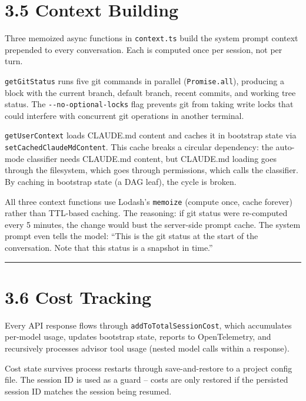 \documentclass[
  english,
  11pt,
  letterpaper,
]{book}
\begin{document}
\section{3.5 Context Building}\label{context-building}

Three memoized async functions in \texttt{context.ts} build the system
prompt context prepended to every conversation. Each is computed once
per session, not per turn.

\texttt{getGitStatus} runs five git commands in parallel
(\texttt{Promise.all}), producing a block with the current branch,
default branch, recent commits, and working tree status. The
\texttt{-\/-no-optional-locks} flag prevents git from taking write locks
that could interfere with concurrent git operations in another terminal.

\texttt{getUserContext} loads CLAUDE.md content and caches it in
bootstrap state via \texttt{setCachedClaudeMdContent}. This cache breaks
a circular dependency: the auto-mode classifier needs CLAUDE.md content,
but CLAUDE.md loading goes through the filesystem, which goes through
permissions, which calls the classifier. By caching in bootstrap state
(a DAG leaf), the cycle is broken.

All three context functions use Lodash's \texttt{memoize} (compute once,
cache forever) rather than TTL-based caching. The reasoning: if git
status were re-computed every 5 minutes, the change would bust the
server-side prompt cache. The system prompt even tells the model: ``This
is the git status at the start of the conversation. Note that this
status is a snapshot in time.''

\begin{center}\rule{0.5\linewidth}{0.5pt}\end{center}

\section{3.6 Cost Tracking}\label{cost-tracking}

Every API response flows through \texttt{addToTotalSessionCost}, which
accumulates per-model usage, updates bootstrap state, reports to
OpenTelemetry, and recursively processes advisor tool usage (nested
model calls within a response).

Cost state survives process restarts through save-and-restore to a
project config file. The session ID is used as a guard -- costs are only
restored if the persisted session ID matches the session being resumed.
\end{document}
